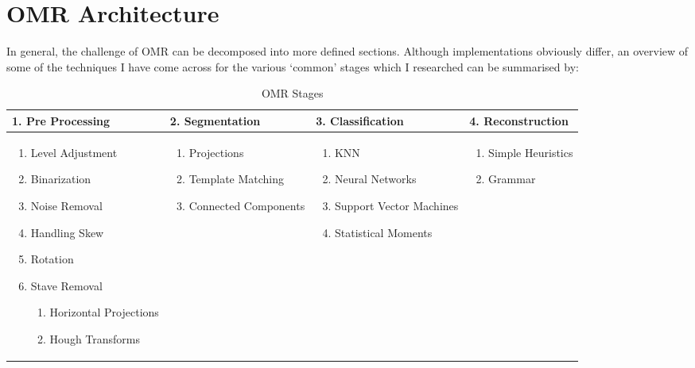 \section{OMR Architecture}

In general, the challenge of OMR can be decomposed into more defined sections. Although implementations obviously differ, an overview of some of the techniques I have come across for the various `common' stages which I researched can be summarised by:

\begin{table}[h]
\footnotesize
\begin{tabularx}{\linewidth}{ X X X X }
\toprule
  \textbf{1. Pre Processing} & \textbf{2. Segmentation} & \textbf{3. Classification} &  \textbf{4. Reconstruction} \\
  \midrule

  \begin{enumerate}[leftmargin=*]
    \item Level Adjustment
    \item Binarization
    \item Noise Removal
    \item Handling Skew
    \item Rotation
    \item Stave Removal
      \begin{enumerate}
        \item Horizontal Projections
        \item Hough Transforms
      \end{enumerate}
  \end{enumerate}

  &

  \begin{enumerate}[leftmargin=*]
    \item Projections
    \item Template Matching
    \item Connected Components
  \end{enumerate}
  
  &

  \begin{enumerate}[leftmargin=*]
    \item \acrfull{KNN}
    \item Neural Networks
    \item Support Vector Machines
    \item Statistical Moments
  \end{enumerate}

  &

  \begin{enumerate}[leftmargin=*]
    \item Simple Heuristics
    \item Grammar
  \end{enumerate} \\
  \bottomrule
\end{tabularx}
\caption{OMR Stages}
\end{table}
